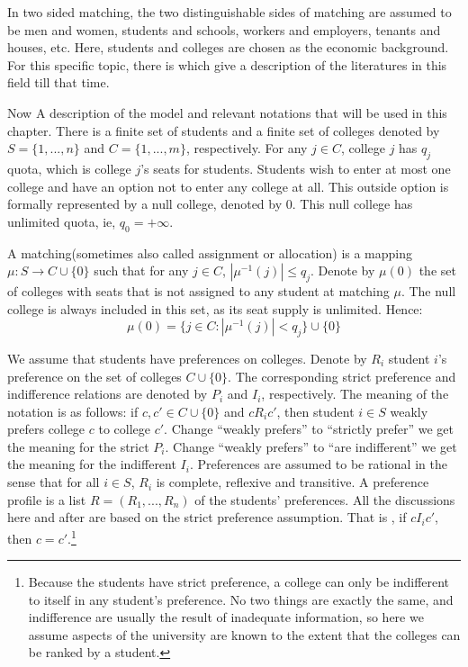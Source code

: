 In two sided matching, the two
distinguishable sides of matching are assumed to be men and women,
students and schools, workers and employers, tenants and houses,
etc. Here, students and colleges are chosen as the economic
background. For this specific topic, there
is \parencite{Sonmez2003}  which give a description of the literatures
in this field till that time. 

Now A description of the model and relevant notations that will be used in this chapter. There is a finite set of students and a finite set of colleges denoted by  $S = \{1,...,n\}$ and $C = \{1,...,m\}$, respectively. For any $j \in C$, college $j$ has $q_j$ quota, which is college $j$'s seats for students. Students wish to enter at most one college and have an option not to enter any college at all. This outside option is formally represented by a null college, denoted by $0$. This null college has unlimited quota, ie, $q_0 = + \infty$. 

A matching(sometimes also called assignment or allocation) is a
mapping $\mu : S \rightarrow C\cup\{0\}$ such that for any $j \in C$,
$|\mu^{-1}(j)| \leq q_j$. Denote by $\mu(0)$ the set of colleges with
seats that is not assigned to any student at matching $\mu$. The null
college is always included in this set, as its seat supply is
unlimited. Hence:
\[ \mu(0) = \{j \in C : |\mu^{-1}(j)| < q_j\}\cup \{0\}\]


We assume that students have preferences on colleges.  Denote by $R_i$ student $i$'s preference on the set of colleges $C \cup \{0\}$. The corresponding strict preference and indifference relations are denoted by $P_i$ and $I_i$, respectively. The meaning of the notation is as follows: if $c,c'\in C \cup \{0\}$ and $c R_i c'$, then student $i \in S$ weakly prefers college $c$ to college $c'$. Change ``weakly prefers'' to ``strictly prefer'' we get the meaning for the strict $P_i$. Change ``weakly prefers'' to ``are indifferent'' we get the meaning for the indifferent $I_i$. Preferences are assumed to be rational in the sense that for all $i \in S$, $R_i$ is complete, reflexive and transitive. A preference profile is a list $ R = (R_1,...,R_n)$ of the students' preferences. All the discussions here and after are based on the strict preference assumption. That is , if $c I_i c'$, then $c=c'$.\footnote{Because the students have strict preference, a college can only be indifferent to itself in any student's preference. No two things are exactly the same, and indifference are usually the result of inadequate information, so here we assume aspects of the university are known to the extent that the colleges can be ranked by a student.}

